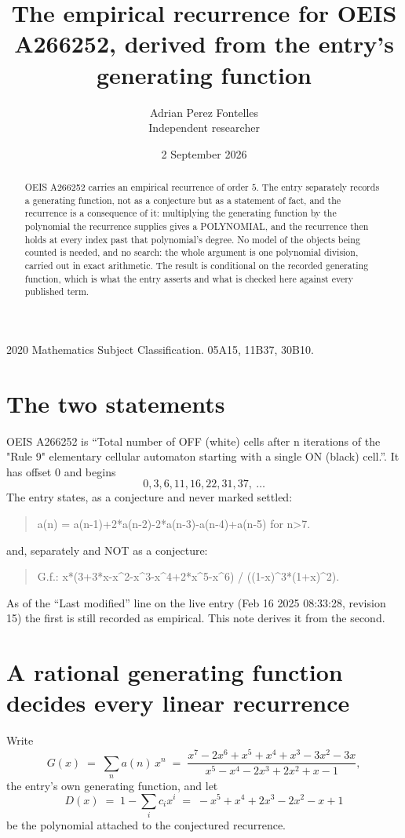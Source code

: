 \documentclass[11pt,a4paper]{article}
\title{The empirical recurrence for OEIS A266252, derived from the entry's generating function}
\author{Adrian Perez Fontelles\\ \small Independent researcher}
\date{2 September 2026}
\theoremstyle{plain}
\theoremstyle{definition}
\begin{document}
\maketitle

\begin{abstract}
OEIS A266252 carries an empirical recurrence of order $5$. The entry separately records a
generating function, not as a conjecture but as a statement of fact, and the recurrence is a
consequence of it: multiplying the generating function by the polynomial the recurrence
supplies gives a POLYNOMIAL, and the recurrence then holds at every index past that
polynomial's degree. No model of the objects being counted is needed, and no search: the
whole argument is one polynomial division, carried out in exact arithmetic. The result is
conditional on the recorded generating function, which is what the entry asserts and what is
checked here against every published term.
\end{abstract}

\noindent\small 2020 Mathematics Subject Classification. 05A15, 11B37, 30B10.\normalsize

\section{The two statements}

OEIS A266252 is ``Total number of OFF (white) cells after n iterations of the "Rule 9" elementary cellular automaton starting with a single ON (black) cell.''. It has offset $0$ and begins
\[
0, 3, 6, 11, 16, 22, 31, 37,\ \dots
\]
The entry states, as a conjecture and never marked settled:
\begin{quote}
a(n) = a(n-1)+2*a(n-2)-2*a(n-3)-a(n-4)+a(n-5) for n>7.
\end{quote}
and, separately and NOT as a conjecture:
\begin{quote}
G.f.: x*(3+3*x-x\^{}2-x\^{}3-x\^{}4+2*x\^{}5-x\^{}6) / ((1-x)\^{}3*(1+x)\^{}2).
\end{quote}
As of the ``Last modified'' line on the live entry (Feb 16 2025 08:33:28, revision 15) the first is still
recorded as empirical. This note derives it from the second.

\section{A rational generating function decides every linear recurrence}

Write
\[
G(x)\;=\;\sum_{n}a(n)\,x^{n}\;=\;\frac{x^{7} - 2 x^{6} + x^{5} + x^{4} + x^{3} - 3 x^{2} - 3 x}{x^{5} - x^{4} - 2 x^{3} + 2 x^{2} + x - 1},
\]
the entry's own generating function, and let
\[
D(x)\;=\;1-\sum_i c_i x^{i}\;=\;- x^{5} + x^{4} + 2 x^{3} - 2 x^{2} - x + 1
\]
be the polynomial attached to the conjectured recurrence.
\end{document}
